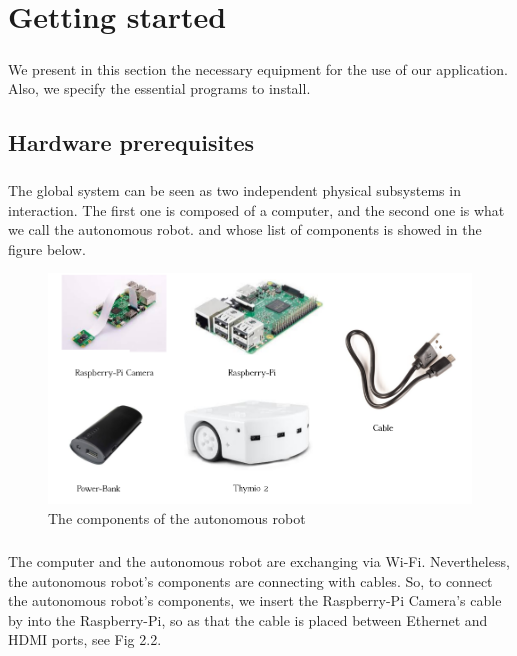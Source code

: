 \documentclass[12pt]{report}
\begin{document}
\chapter{Getting started}
\paragraph{}
We present in this section the necessary equipment for the use of our application. Also, we specify the essential programs to install.
\section{Hardware prerequisites}
\paragraph{}
The global system can be seen as two independent physical subsystems in interaction. The first one is composed of a computer, and the second one is what we call the autonomous robot. and whose list of components is showed in the figure below.
\begin{figure}[H]
	\begin{center}
		\includegraphics[scale=0.6]{comp.png}
		\caption{The components of the autonomous robot}
	\end{center}
\end{figure}
\paragraph{}
The computer and the autonomous robot are exchanging via Wi-Fi. Nevertheless, the autonomous robot's components are connecting with cables. 
So, to connect the autonomous robot's components, we insert the Raspberry-Pi Camera's cable by into the Raspberry-Pi, so as that the cable is placed between Ethernet and HDMI ports, see Fig 2.2. 
\end{document}
